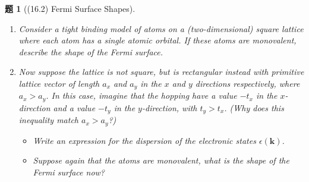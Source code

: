 \documentclass[UTF8,10pt,a4paper]{article}
\theoremstyle{Problem}
\newtheorem{prob}{题}
\theoremstyle{Solution}
\begin{document}
\begin{prob}[(16.2) Fermi Surface Shapes]
    \begin{enumerate}
        \item[(a)] Consider a tight binding model of atoms on a (two-dimensional) square lattice where each atom has a single atomic orbital. If these atoms are monovalent, describe the shape of the Fermi surface.
        \item[(b)] Now suppose the lattice is not square, but is rectangular instead with primitive lattice vector of length $a_x$ and $a_y$ in the $x$ and $y$ directions respectively, where $a_x>a_y$. In this case, imagine that the hopping have a value $-t_x$ in the $x$-direction and a value $-t_y$ in the $y$-direction, with $t_y>t_x$. (Why does this inequality match $a_x>a_y$?)
        \begin{itemize}
            \item[$\triangleright$] Write an expression for the dispersion of the electronic states $\epsilon(\bm{k})$.
            \item[$\triangleright$] Suppose again that the atoms are monovalent, what is the shape of the Fermi surface now?
        \end{itemize}
    \end{enumerate}
\end{prob}
\end{document}
